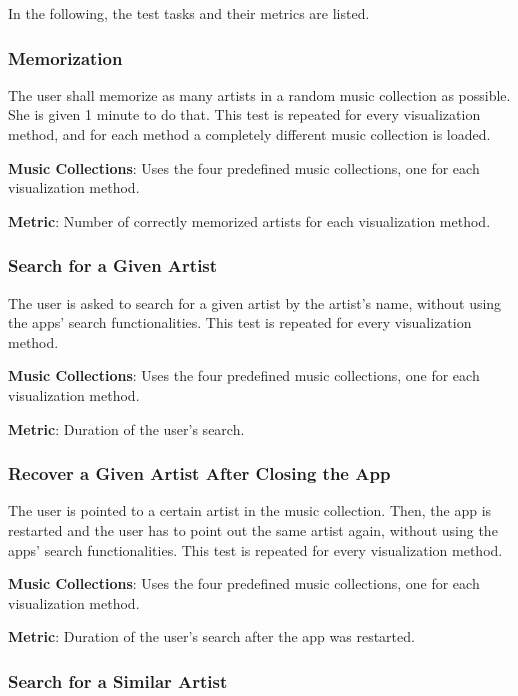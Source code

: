 In the following, the test tasks and their metrics are listed. 


\subsubsection{Memorization}

The user shall memorize as many artists in a random music collection as possible. She is given 1 minute to do that. This test is repeated for every visualization method, and for each method a completely different music collection is loaded.

\textbf{Music Collections}: Uses the four predefined music collections, one for each visualization method.

\textbf{Metric}: Number of correctly memorized artists for each visualization method.

	
\subsubsection{Search for a Given Artist}
	
The user is asked to search for a given artist by the artist's name, without using the apps' search functionalities. This test is repeated for every visualization method.

\textbf{Music Collections}: Uses the four predefined music collections, one for each visualization method. 

\textbf{Metric}: Duration of the user's search.
	
	
\subsubsection{Recover a Given Artist After Closing the App}
	
The user is pointed to a certain artist in the music collection. Then, the app is restarted and the user has to point out the same artist again, without using the apps' search functionalities. This test is repeated for every visualization method.

\textbf{Music Collections}: Uses the four predefined music collections, one for each visualization method. 

\textbf{Metric}: Duration of the user's search after the app was restarted.
	
	
\subsubsection{Search for a Similar Artist}

